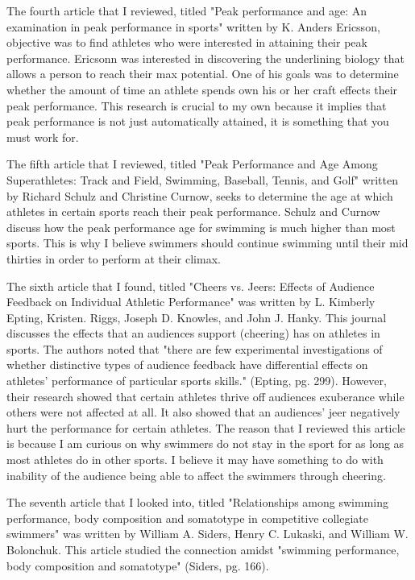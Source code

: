 \documentclass[letterpaper, 10 pt, conference]{ieeeconf}  %
\begin{document}
The fourth article that I reviewed, titled "Peak performance and age: An examination in peak performance in sports" written by K. Anders Ericsson, objective was to find athletes who were interested in attaining their peak performance. Ericsonn was interested in discovering the underlining biology that allows a person to reach their max potential. One of his goals was to determine whether the amount of time an athlete spends own his or her craft effects their peak performance. This research is crucial to my own because it implies that peak performance is not just automatically attained, it is something that you must work for. ~\cite{ericsson}

The fifth article that I reviewed, titled "Peak Performance and Age Among Superathletes: Track and Field, Swimming, Baseball, Tennis, and Golf" written by Richard Schulz and Christine Curnow, seeks to determine the age at which athletes in certain sports reach their peak performance. Schulz and Curnow discuss how the peak performance age for swimming is much higher than most sports. This is why I believe swimmers should continue swimming until their mid thirties in order to perform at their climax. ~\cite{schulz_curnow_1988}

The sixth article that I found, titled "Cheers vs. Jeers: Effects of Audience Feedback on Individual Athletic Performance" was written by L. Kimberly Epting, Kristen. Riggs, Joseph D. Knowles, and John J. Hanky. This journal discusses the effects that an audiences support (cheering) has on athletes in sports. The authors noted that "there are few experimental investigations of whether distinctive types of audience feedback have differential effects on athletes’ performance of particular sports skills." (Epting, pg. 299). However, their research showed that certain athletes thrive off audiences exuberance while others were not affected at all. It also showed that an audiences' jeer negatively hurt the performance for certain athletes. The reason that I reviewed this article is because I am curious on why swimmers do not stay in the sport for as long as most athletes do in other sports. I believe it may have something to do with inability of the audience being able to affect the swimmers through cheering. ~\cite{epting_riggs_knowles_hanky_2011}

The seventh article that I looked into, titled "Relationships among swimming performance, body composition and somatotype in competitive collegiate swimmers" was written by William A. Siders, Henry C. Lukaski, and William W. Bolonchuk. This article studied the connection amidst "swimming performance, body composition and somatotype" (Siders, pg. 166). ~\cite{a_c_w_1993}
\end{document}

